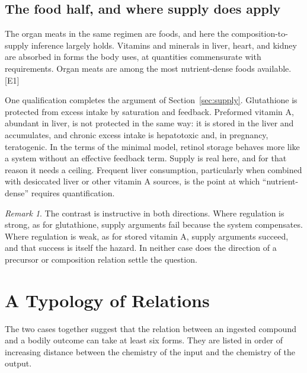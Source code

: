\documentclass[11pt,a4paper]{article}
\theoremstyle{plain}
\theoremstyle{definition}
\theoremstyle{remark}
\newtheorem{remark}{Remark}
\newcommand{\tier}[1]{\textup{\textsc{[#1]}}}
\newcommand{\Eone}{\tier{E1}}
\begin{document}
\subsection{The food half, and where supply does apply}

The organ meats in the same regimen are foods, and here the composition-to-supply inference largely holds. Vitamins and minerals in liver, heart, and kidney are absorbed in forms the body uses, at quantities commensurate with requirements. Organ meats are among the most nutrient-dense foods available. \Eone

One qualification completes the argument of Section~\ref{sec:supply}. Glutathione is protected from excess intake by saturation and feedback. Preformed vitamin A, abundant in liver, is not protected in the same way: it is stored in the liver and accumulates, and chronic excess intake is hepatotoxic and, in pregnancy, teratogenic. In the terms of the minimal model, retinol storage behaves more like a system without an effective feedback term. Supply is real here, and for that reason it needs a ceiling. Frequent liver consumption, particularly when combined with desiccated liver or other vitamin A sources, is the point at which ``nutrient-dense'' requires quantification.

\begin{remark}
The contrast is instructive in both directions. Where regulation is strong, as for glutathione, supply arguments fail because the system compensates. Where regulation is weak, as for stored vitamin A, supply arguments succeed, and that success is itself the hazard. In neither case does the direction of a precursor or composition relation settle the question.
\end{remark}

\section{A Typology of Relations}

The two cases together suggest that the relation between an ingested compound and a bodily outcome can take at least six forms. They are listed in order of increasing distance between the chemistry of the input and the chemistry of the output.
\end{document}
